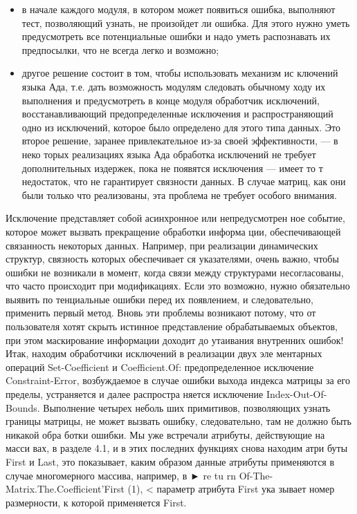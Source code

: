 \begin{itemize}  
\item в начале каждого модуля, в котором может появиться ошибка,
выполняют тест, позволяющий узнать, не произойдет ли ошибка.
Для этого нужно уметь предусмотреть все потенциальные ошибки
и надо уметь распознавать их предпосылки, что не всегда легко
и возможно;
\item другое решение состоит в том, чтобы использовать механизм ис­
ключений языка Ада, т.е. дать возможность модулям следовать
\newpage
обычному ходу их выполнения и предусмотреть в конце модуля
обработчик исключений, восстанавливающий предопределенные
исключения и распространяющий одно из исключений, которое
было определено для этого типа данных. Это второе решение,
заранее привлекательное из-за своей эффективности, — в неко­
торых реализациях языка Ада обработка исключений не требует
дополнительных издержек, пока не появятся исключения — имеет
то т недостаток, что не гарантирует связности данных. В случае
матриц, как они были только что реализованы, эта проблема не
требует особого внимания.
\end{itemize}

Исключение представляет собой асинхронное или непредусмотрен­
ное событие, которое может вызвать прекращение обработки информа­
ции, обеспечивающей связанность некоторых данных. Например, при
реализации динамических структур, связность которых обеспечивает­
ся указателями, очень важно, чтобы ошибки не возникали в момент,
когда связи между структурами несогласованы, что часто происходит
при модификациях. Если это возможно, нужно обязательно выявить по­
тенциальные ошибки перед их появлением, и следовательно, применить
первый метод.
Вновь эти проблемы возникают потому, что от пользователя хотят
скрыть истинное представление обрабатываемых объектов, при этом
маскирование информации доходит до утаивания внутренних ошибок!
Итак, находим обработчики исключений в реализации двух эле­
ментарных операций Set-Coefficient и Coefficient.Of: предопределенное
исключение Constraint-Error, возбуждаемое в случае ошибки выхода
индекса матрицы за его пределы, устраняется и далее распростра­
няется исключение Index-Out-Of-Bounds. Выполнение четырех неболь­
ших примитивов, позволяющих узнать границы матрицы, не может
вызвать ошибку, следовательно, там не должно быть никакой обра­
ботки ошибки. Мы уже встречали атрибуты, действующие на масси­
вах, в разделе 4.1, и в этих последних функциях снова находим атри­
буты First и Last, это показывает, каким образом данные атрибуты
применяются в случае многомерного массива, например, в ► re tu rn
Of-The-Matrix.The.Coefficient’First (1), < параметр атрибута First ука­
зывает номер размерности, к которой применяется First.

